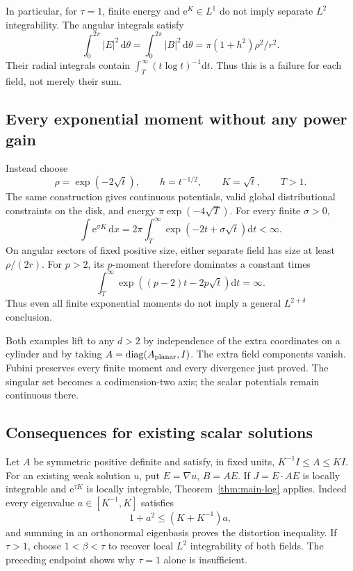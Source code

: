 \documentclass[11pt,a4paper]{article}
\numberwithin{equation}{section}
\theoremstyle{definition}
\theoremstyle{remark}\newtheorem{remark}[theorem]{Remark}
\DeclareMathOperator{\diag}{diag}
\newcommand{\ee}{\mathrm e}
\newcommand{\Id}{I}
\newcommand{\dd}{\,\mathrm dx}
\begin{document}
In particular, for \(\tau=1\), finite energy and
\(\ee^K\in L^1\) do not imply separate \(L^2\) integrability.
The angular integrals satisfy
\[
 \int_0^{2\pi}|E|^2\,\mathrm d\theta
 =\int_0^{2\pi}|B|^2\,\mathrm d\theta
 =\pi(1+h^2)\rho^2/r^2.
\]
Their radial integrals contain
\(\int_T^\infty(t\log t)^{-1}\mathrm dt\).
Thus this is a failure for each field, not merely their sum.

\subsection{Every exponential moment without any power gain}

Instead choose
\[
 \rho=\exp(-2\sqrt t),\qquad h=t^{-1/2},\qquad K=\sqrt t,
 \qquad T>1.
\]
The same construction gives continuous potentials, valid global
distributional constraints on the disk, and energy
\(\pi\exp(-4\sqrt T)\).
For every finite \(\sigma>0\),
\[
 \int\ee^{\sigma K}\dd
 =2\pi\int_T^\infty\exp(-2t+\sigma\sqrt t)\mathrm dt<\infty.
\]
On angular sectors of fixed positive size, either separate field has
size at least \(\rho/(2r)\). For \(p>2\), its \(p\)-moment therefore
dominates a constant times
\[
 \int_T^\infty\exp((p-2)t-2p\sqrt t)\mathrm dt=\infty.
\]
Thus even all finite exponential moments do not imply a general
\(L^{2+\delta}\) conclusion.

Both examples lift to any \(d>2\) by independence of the extra
coordinates on a cylinder and by taking \(A=\diag(A_{\rm planar},\Id)\).
The extra field components vanish. Fubini preserves every finite
moment and every divergence just proved. The singular set becomes a
codimension-two axis; the scalar potentials remain continuous there.

\subsection{Consequences for existing scalar solutions}

Let \(A\) be symmetric positive definite and satisfy, in fixed units,
\(K^{-1}\Id\leq A\leq K\Id\).
For an existing weak solution \(u\), put \(E=\nabla u\), \(B=AE\).
If \(J=E\cdot AE\) is locally integrable and \(\ee^{\tau K}\) is
locally integrable, Theorem~\ref{thm:main-log} applies. Indeed every
eigenvalue \(a\in[K^{-1},K]\) satisfies
\[
 1+a^2\leq(K+K^{-1})a,
\]
and summing in an orthonormal eigenbasis proves the distortion inequality.
If \(\tau>1\), choose \(1<\beta<\tau\) to recover local \(L^2\)
integrability of both fields. The preceding endpoint shows why
\(\tau=1\) alone is insufficient.
\end{document}
